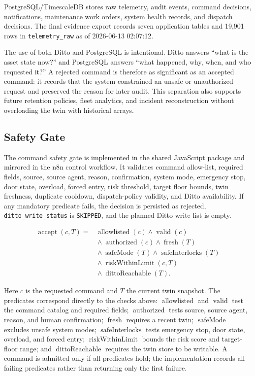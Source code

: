 \documentclass[journal]{IEEEtran}
\newcommand{\artifact}[1]{\texttt{#1}}
\begin{document}
PostgreSQL/TimescaleDB stores raw telemetry, audit events, command decisions, notifications, maintenance work orders, system health records, and dispatch decisions. The final evidence export records seven application tables and 19,901 rows in \artifact{telemetry\_raw} as of 2026-06-13 02:07:12.

The use of both Ditto and PostgreSQL is intentional. Ditto answers ``what is the asset state now?'' and PostgreSQL answers ``what happened, why, when, and who requested it?'' A rejected command is therefore as significant as an accepted command: it records that the system constrained an unsafe or unauthorized request and preserved the reason for later audit. This separation also supports future retention policies, fleet analytics, and incident reconstruction without overloading the twin with historical arrays.

\subsection{Safety Gate}

The command safety gate is implemented in the shared JavaScript package and mirrored in the n8n control workflow. It validates command allow-list, required fields, source, source agent, reason, confirmation, system mode, emergency stop, door state, overload, forced entry, risk threshold, target floor bounds, twin freshness, duplicate cooldown, dispatch-policy validity, and Ditto availability. If any mandatory predicate fails, the decision is persisted as rejected, \artifact{ditto\_write\_status} is \artifact{SKIPPED}, and the planned Ditto write list is empty.

\begin{equation}
\label{eq:gate}
\begin{aligned}
\operatorname{accept}(c,T) ={}& \operatorname{allowlisted}(c) \wedge \operatorname{valid}(c) \\
&{}\wedge \operatorname{authorized}(c) \wedge \operatorname{fresh}(T) \\
&{}\wedge \operatorname{safeMode}(T) \wedge \operatorname{safeInterlocks}(T) \\
&{}\wedge \operatorname{riskWithinLimit}(c,T) \\
&{}\wedge \operatorname{dittoReachable}(T).
\end{aligned}
\end{equation}

Here $c$ is the requested command and $T$ the current twin snapshot. The predicates correspond directly to the checks above: $\operatorname{allowlisted}$ and $\operatorname{valid}$ test the command catalog and required fields; $\operatorname{authorized}$ tests source, source agent, reason, and human confirmation; $\operatorname{fresh}$ requires a recent twin; $\operatorname{safeMode}$ excludes unsafe system modes; $\operatorname{safeInterlocks}$ tests emergency stop, door state, overload, and forced entry; $\operatorname{riskWithinLimit}$ bounds the risk score and target-floor range; and $\operatorname{dittoReachable}$ requires the twin store to be writable. A command is admitted only if all predicates hold; the implementation records all failing predicates rather than returning only the first failure.
\end{document}
